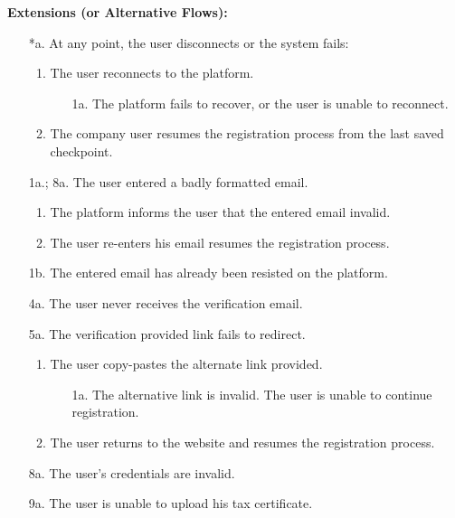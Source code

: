 \begin{itemize}[label={[\textbf{UC}]}, align=left, leftmargin=*]
    \textbf{Extensions (or Alternative Flows):} 
    \begin{enumerate}[label=\arabic*.]
        \item[*a.] At any point, the user disconnects or the system fails:
            \begin{enumerate}[label=\arabic*.]
                \item The user reconnects to the platform.
                    \begin{enumerate}[label=\alph*.]
                        \item[1a.] The platform fails to recover, or the user is unable to reconnect.
                    \end{enumerate}
                 \item The company user resumes the registration process from the last saved checkpoint.
            \end{enumerate}
        \item[1a.; 8a.] The user entered a badly formatted email.
            \begin{enumerate}[label=\arabic*.]
                \item The platform informs the user that the entered email invalid.
                \item The user re-enters his email resumes the registration process.
            \end{enumerate}
        \item[1b.] The entered email has already been resisted on the platform.
        \item[4a.] The user never receives the verification email.
        \item[5a.] The verification provided link fails to redirect.
            \begin{enumerate}[label=\arabic*.]
                \item The user copy-pastes the alternate link provided.
                    \begin{enumerate}[label=\alph*.]
                        \item[1a.] The alternative link is invalid. The user is unable to continue registration.
                    \end{enumerate}
                \item The user returns to the website and resumes the registration process.
            \end{enumerate}
        \item[8a.] The user's credentials are invalid.
        \item[9a.] The user is unable to upload his tax certificate.
    \end{enumerate}


\end{itemize}
